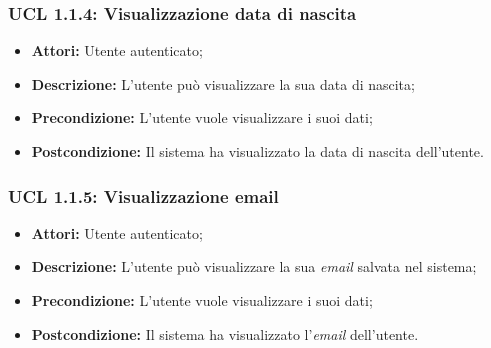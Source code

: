 \hypertarget{L1.1.4}{}
\subsubsection{UCL 1.1.4: Visualizzazione data di nascita}
\begin{itemize}
	\item \textbf{Attori:} Utente autenticato;
	\item \textbf{Descrizione:} L'utente può visualizzare la sua data di nascita;
	\item \textbf{Precondizione:} L'utente vuole visualizzare i suoi dati;
	\item \textbf{Postcondizione:} Il sistema ha visualizzato la data di nascita dell'utente.
\end{itemize}

\hypertarget{L1.1.5}{}
\subsubsection{UCL 1.1.5: Visualizzazione email}
\begin{itemize}
	\item \textbf{Attori:} Utente autenticato;
	\item \textbf{Descrizione:} L'utente può visualizzare la sua \textit{email} salvata nel sistema;
	\item \textbf{Precondizione:} L'utente vuole visualizzare i suoi dati;
	\item \textbf{Postcondizione:} Il sistema ha visualizzato l'\textit{email} dell'utente.
\end{itemize}

 
\hypertarget{L1.2}{}

